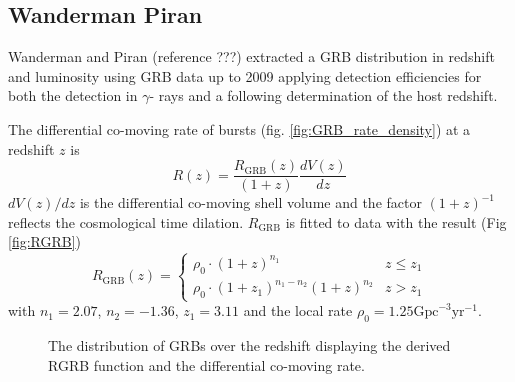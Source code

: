 \subsection{Wanderman Piran}
\label{ssec:WP}
Wanderman and Piran (reference ???) extracted a GRB distribution in redshift and
luminosity using GRB data up to 2009 applying detection efficiencies for
both the detection in $\gamma$- rays and a following determination of the host
redshift. 

The differential co-moving rate of bursts (fig. \ref{fig:GRB_rate_density}) at a
redshift $z$ is
\begin{equation}
 R(z) = \frac{R_{\text{GRB}}(z)}{(1+z)} \frac{dV(z)}{dz}
 \label{eq:Rz}
\end{equation}
$dV(z)/dz$ is the differential co-moving shell volume 
and the factor $(1+z)^{-1}$ reflects the cosmological time dilation.
$R_{\text{GRB}}$ is fitted to data with the result (Fig \ref{fig:RGRB})
\begin{equation}
\label{eq:R_z}
    R_{\text{GRB}}(z) = \begin{cases}
                        \rho_0 \cdot (1 + z)^{n_1} & z \leq z_1 \\
			 \rho_0 \cdot (1 + z_1)^{n_1 - n_2}(1 + z)^{n_2} & z >
z_1
                        \end{cases}
\end{equation}
with
$n_1= 2.07$, $n_2=-1.36$, $z_1=3.11$ and the local rate $\rho_0=1.25
\text{Gpc}^{-3} \text{yr}^{-1}$.


\begin{figure}[h]
\centering
 \captionsetup{width=.9\textwidth}
\caption{The distribution of GRBs over the redshift displaying the derived RGRB 
function and the differential co-moving rate.}
\end{figure}




